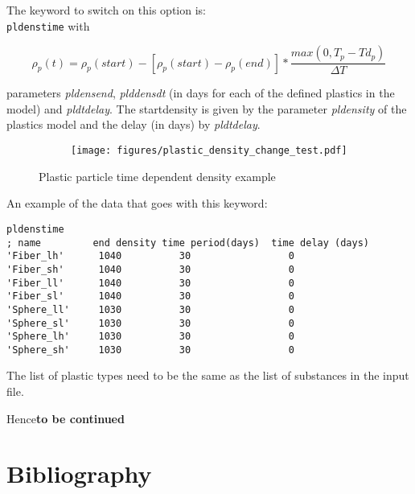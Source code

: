 \documentclass[english]{deltares_manual}
\begin{document}
The keyword to switch on this option is:\\
\texttt{pldenstime} with 

\begin{equation}\label{tdensity}
\rho_{p}(t) = \rho_{p}(start) - \left[ \rho_{p}(start)- \rho_{p}(end) \right] * \dfrac{max(0, T_{p} - Td_{p})}{\Delta T}
\end{equation}

parameters \textit{pldensend}, \textit{plddensdt} (in days for each of the defined plastics in the model) and \textit{pldtdelay}. The startdensity is given by the parameter \textit{pldensity} of the plastics model and the delay (in days) by \textit{pldtdelay}. 

\begin{figure}[H]%
		\begin{subfigure}{0.7\textwidth}
			\texttt{[image: figures/plastic\_density\_change\_test.pdf]}%
		\end{subfigure}
	\caption{Plastic particle time dependent density example}
	\label{fig:densitytime}
\end{figure}

An example of the data that goes with this keyword:
\begin{tcolorbox}
\begin{Verbatim}
pldenstime
; name         end density time period(days)  time delay (days)
'Fiber_lh'      1040          30                 0
'Fiber_sh'      1040          30                 0
'Fiber_ll'      1040          30                 0
'Fiber_sl'      1040          30                 0
'Sphere_ll'     1030          30                 0
'Sphere_sl'     1030          30                 0
'Sphere_lh'     1030          30                 0
'Sphere_sh'     1030          30                 0
\end{Verbatim}
\end{tcolorbox}
The list of plastic types need to be the same as the list of substances in the input file.

Hence\textbf{to be continued}

\chapter*{Bibliography}


\end{document}
